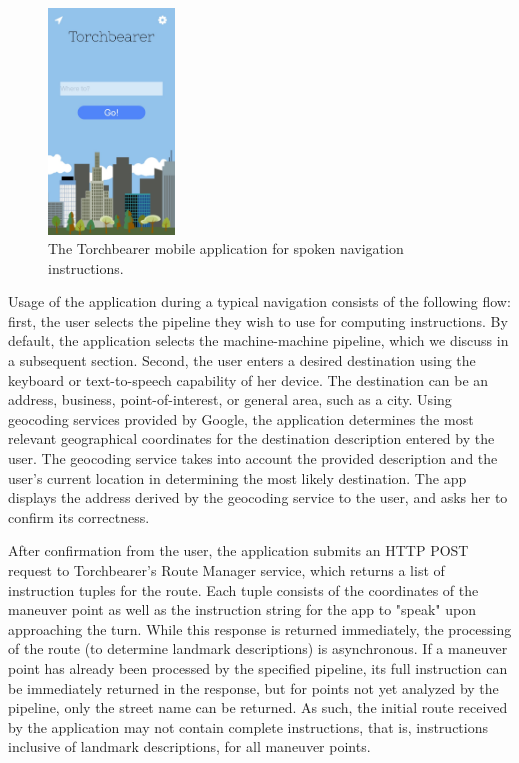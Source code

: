 \begin{figure}[htbp]
  \centering
  \includegraphics[width=0.3\textwidth]{images/ui.png}
  \caption{The Torchbearer mobile application for spoken navigation instructions.}
  \label{fig:ui}
\end{figure}

Usage of the application during a typical navigation consists of the following flow: first, the user selects the pipeline they wish to use for computing instructions. By default, the application selects the machine-machine pipeline, which we discuss in a subsequent section. Second, the user enters a desired destination using the keyboard or text-to-speech capability of her device. The destination can be an address, business, point-of-interest, or general area, such as a city. Using geocoding services provided by Google, the application determines the most relevant geographical coordinates for the destination description entered by the user. The geocoding service takes into account the provided description and the user's current location in determining the most likely destination. The app displays the address derived by the geocoding service to the user, and asks her to confirm its correctness.

After confirmation from the user, the application submits an HTTP POST request to Torchbearer's Route Manager service, which returns a list of instruction tuples for the route. Each tuple consists of the coordinates of the maneuver point as well as the instruction string for the app to "speak" upon approaching the turn. While this response is returned immediately, the processing of the route (to determine landmark descriptions) is asynchronous. If a maneuver point has already been processed by the specified pipeline, its full instruction can be immediately returned in the response, but for points not yet analyzed by the pipeline, only the street name can be returned. As such, the initial route received by the application may not contain complete instructions, that is, instructions inclusive of landmark descriptions, for all maneuver points. 

